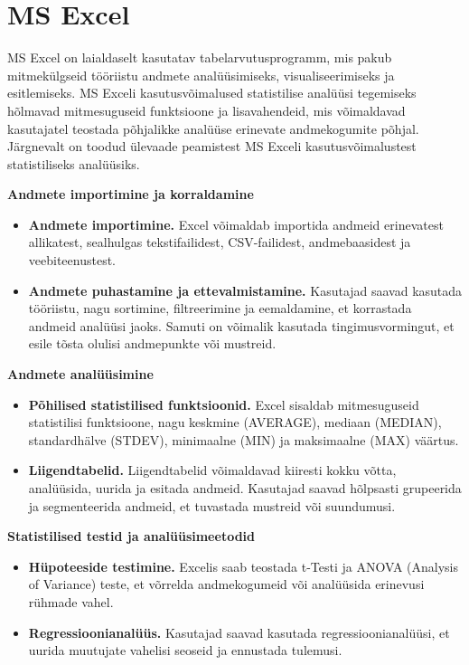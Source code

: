 \documentclass[
]{book}
\providecommand{\tightlist}{%
  \setlength{\itemsep}{0pt}\setlength{\parskip}{0pt}}
\theoremstyle{definition}
\theoremstyle{definition}
\theoremstyle{definition}
\theoremstyle{definition}
\theoremstyle{remark}
\begin{document}
\section{MS Excel}\label{ms-excel}

MS Excel on laialdaselt kasutatav tabelarvutusprogramm, mis pakub mitmekülgseid tööriistu andmete analüüsimiseks, visualiseerimiseks ja esitlemiseks. MS Exceli kasutusvõimalused statistilise analüüsi tegemiseks hõlmavad mitmesuguseid funktsioone ja lisavahendeid, mis võimaldavad kasutajatel teostada põhjalikke analüüse erinevate andmekogumite põhjal. Järgnevalt on toodud ülevaade peamistest MS Exceli kasutusvõimalustest statistiliseks analüüsiks.

\textbf{Andmete importimine ja korraldamine}

\begin{itemize}
\tightlist
\item
  \textbf{Andmete importimine.} Excel võimaldab importida andmeid erinevatest allikatest, sealhulgas tekstifailidest, CSV-failidest, andmebaasidest ja veebiteenustest.
\item
  \textbf{Andmete puhastamine ja ettevalmistamine.} Kasutajad saavad kasutada tööriistu, nagu sortimine, filtreerimine ja eemaldamine, et korrastada andmeid analüüsi jaoks. Samuti on võimalik kasutada tingimusvormingut, et esile tõsta olulisi andmepunkte või mustreid.
\end{itemize}

\textbf{Andmete analüüsimine}

\begin{itemize}
\tightlist
\item
  \textbf{Põhilised statistilised funktsioonid.} Excel sisaldab mitmesuguseid statistilisi funktsioone, nagu keskmine (AVERAGE), mediaan (MEDIAN), standardhälve (STDEV), minimaalne (MIN) ja maksimaalne (MAX) väärtus.
\item
  \textbf{Liigendtabelid.} Liigendtabelid võimaldavad kiiresti kokku võtta, analüüsida, uurida ja esitada andmeid. Kasutajad saavad hõlpsasti grupeerida ja segmenteerida andmeid, et tuvastada mustreid või suundumusi.
\end{itemize}

\textbf{Statistilised testid ja analüüsimeetodid}

\begin{itemize}
\tightlist
\item
  \textbf{Hüpoteeside testimine.} Excelis saab teostada t-Testi ja ANOVA (Analysis of Variance) teste, et võrrelda andmekogumeid või analüüsida erinevusi rühmade vahel.
\item
  \textbf{Regressioonianalüüs.} Kasutajad saavad kasutada regressioonianalüüsi, et uurida muutujate vahelisi seoseid ja ennustada tulemusi.
\end{itemize}
\end{document}
